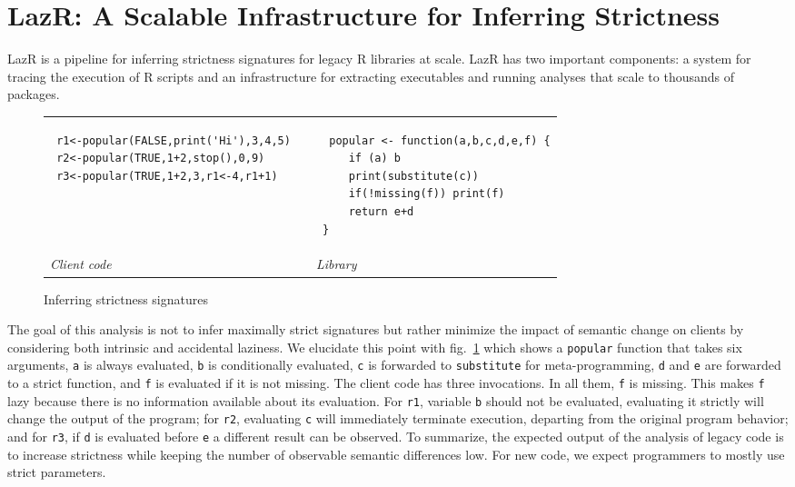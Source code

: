 \documentclass[review,creen,acmsmall]{acmart}
\renewcommand{\c}[1]{\lstinline |#1|\xspace}
\newcommand{\lazr}{{\sf LazR}\xspace}
\begin{document}
\section{LazR: A Scalable Infrastructure for Inferring Strictness}\label{sec:lazr}

\lazr is a pipeline for inferring strictness signatures for legacy R libraries
at scale. \lazr has two important components: a system for tracing the execution
of R scripts and an infrastructure for extracting executables and running
analyses that scale to thousands of packages.

\begin{figure}[!h]
  \begin{tabular}{lll}
    \begin{minipage}{6cm}
\begin{lstlisting}
 r1<-popular(FALSE,print('Hi'),3,4,5)
 r2<-popular(TRUE,1+2,stop(),0,9)
 r3<-popular(TRUE,1+2,3,r1<-4,r1+1)
\end{lstlisting}
    \end{minipage}
    &&
       \begin{minipage}{6cm}
\begin{lstlisting}
  popular <- function(a,b,c,d,e,f) {
     if (a) b
     print(substitute(c))
     if(!missing(f)) print(f)
     return e+d
 }
\end{lstlisting}
       \end{minipage}\\
    \it Client code&& \it Library
  \end{tabular}%
  \caption{Inferring strictness signatures}\label{iss} %
\end{figure}

The goal of this analysis is not to infer maximally strict signatures but rather
minimize the impact of semantic change on clients by considering both intrinsic
and accidental laziness. We elucidate this point with fig.~\ref{iss} which
shows a \c{popular} function that takes six arguments, \c{a} is always
evaluated, \c{b} is conditionally evaluated, \c{c} is forwarded to
\c{substitute} for meta-programming, \c{d} and \c{e} are forwarded to a
strict function, and \c{f} is evaluated if it is not missing. The client code
has three invocations. In all them, \c{f} is missing. This makes \c{f}
lazy because there is no information available about its evaluation. For \c{r1},
variable \c b should not be evaluated, evaluating it strictly will change the
output of the program; for \c{r2}, evaluating \c{c} will immediately
terminate execution, departing from the original program behavior; and for
\c{r3}, if \c{d} is evaluated before \c{e} a different result can be observed.
To summarize, the expected output of the analysis of legacy code is to increase
strictness while keeping the number of observable semantic differences low. For
new code, we expect programmers to mostly use strict parameters.
\end{document}
